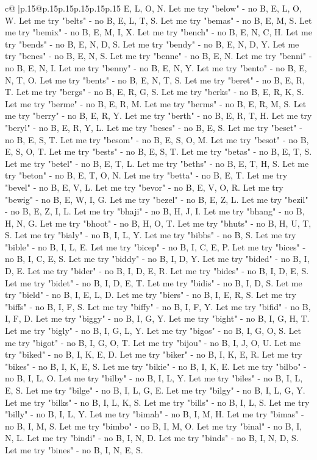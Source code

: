 \documentclass{article}
\begin{document}
{\begin{supertabular}{c@{$\;$}|p{.15\linewidth}@{}p{.15\linewidth}p{.15\linewidth}p{.15\linewidth}p{.15\linewidth}p{.15\linewidth}}
{{{E, L, O, N. Let me try "below" {-} no B, E, L, O, W. Let me try "belts" {-} no B, E, L, T, S. Let me try "bemas" {-} no B, E, M, S. Let me try "bemix" {-} no B, E, M, I, X. Let me try "bench" {-} no B, E, N, C, H. Let me try "bends" {-} no B, E, N, D, S. Let me try "bendy" {-} no B, E, N, D, Y. Let me try "benes" {-} no B, E, N, S. Let me try "benne" {-} no B, E, N. Let me try "benni" {-} no B, E, N, I. Let me try "benny" {-} no B, E, N, Y. Let me try "bento" {-} no B, E, N, T, O. Let me try "bents" {-} no B, E, N, T, S. Let me try "beret" {-} no B, E, R, T. Let me try "bergs" {-} no B, E, R, G, S. Let me try "berks" {-} no B, E, R, K, S. Let me try "berme" {-} no B, E, R, M. Let me try "berms" {-} no B, E, R, M, S. Let me try "berry" {-} no B, E, R, Y. Let me try "berth" {-} no B, E, R, T, H. Let me try "beryl" {-} no B, E, R, Y, L. Let me try "beses" {-} no B, E, S. Let me try "beset" {-} no B, E, S, T. Let me try "besom" {-} no B, E, S, O, M. Let me try "besot" {-} no B, E, S, O, T. Let me try "bests" {-} no B, E, S, T. Let me try "betas" {-} no B, E, T, S. Let me try "betel" {-} no B, E, T, L. Let me try "beths" {-} no B, E, T, H, S. Let me try "beton" {-} no B, E, T, O, N. Let me try "betta" {-} no B, E, T. Let me try "bevel" {-} no B, E, V, L. Let me try "bevor" {-} no B, E, V, O, R. Let me try "bewig" {-} no B, E, W, I, G. Let me try "bezel" {-} no B, E, Z, L. Let me try "bezil" {-} no B, E, Z, I, L. Let me try "bhaji" {-} no B, H, J, I. Let me try "bhang" {-} no B, H, N, G. Let me try "bhoot" {-} no B, H, O, T. Let me try "bhuts" {-} no B, H, U, T, S. Let me try "bialy" {-} no B, I, L, Y. Let me try "bibbs" {-} no B, S. Let me try "bible" {-} no B, I, L, E. Let me try "bicep" {-} no B, I, C, E, P. Let me try "bices" {-} no B, I, C, E, S. Let me try "biddy" {-} no B, I, D, Y. Let me try "bided" {-} no B, I, D, E. Let me try "bider" {-} no B, I, D, E, R. Let me try "bides" {-} no B, I, D, E, S. Let me try "bidet" {-} no B, I, D, E, T. Let me try "bidis" {-} no B, I, D, S. Let me try "bield" {-} no B, I, E, L, D. Let me try "biers" {-} no B, I, E, R, S. Let me try "biffs" {-} no B, I, F, S. Let me try "biffy" {-} no B, I, F, Y. Let me try "bifid" {-} no B, I, F, D. Let me try "biggy" {-} no B, I, G, Y. Let me try "bight" {-} no B, I, G, H, T. Let me try "bigly" {-} no B, I, G, L, Y. Let me try "bigos" {-} no B, I, G, O, S. Let me try "bigot" {-} no B, I, G, O, T. Let me try "bijou" {-} no B, I, J, O, U. Let me try "biked" {-} no B, I, K, E, D. Let me try "biker" {-} no B, I, K, E, R. Let me try "bikes" {-} no B, I, K, E, S. Let me try "bikie" {-} no B, I, K, E. Let me try "bilbo" {-} no B, I, L, O. Let me try "bilby" {-} no B, I, L, Y. Let me try "biles" {-} no B, I, L, E, S. Let me try "bilge" {-} no B, I, L, G, E. Let me try "bilgy" {-} no B, I, L, G, Y. Let me try "bilks" {-} no B, I, L, K, S. Let me try "bills" {-} no B, I, L, S. Let me try "billy" {-} no B, I, L, Y. Let me try "bimah" {-} no B, I, M, H. Let me try "bimas" {-} no B, I, M, S. Let me try "bimbo" {-} no B, I, M, O. Let me try "binal" {-} no B, I, N, L. Let me try "bindi" {-} no B, I, N, D. Let me try "binds" {-} no B, I, N, D, S. Let me try "bines" {-} no B, I, N, E, S. }}}
\end{supertabular}}
\end{document}
